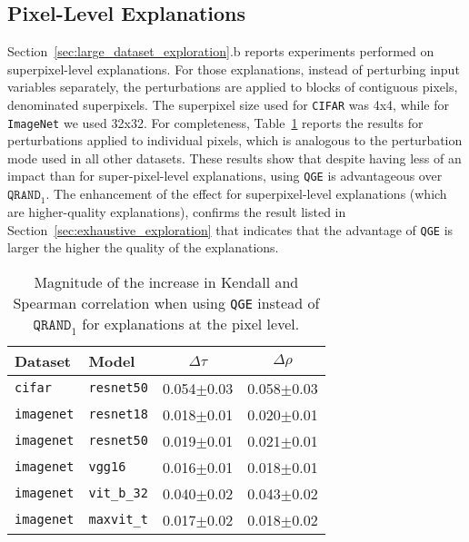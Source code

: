\subsection{Pixel-Level Explanations}\label{sec:pixel-level-explanations}
Section~\ref{sec:large_dataset_exploration}.b reports experiments performed on superpixel-level explanations. For those explanations, instead of perturbing input variables separately, the perturbations are applied to blocks of contiguous pixels, denominated superpixels. The superpixel size used for \texttt{CIFAR} was 4x4, while for \texttt{ImageNet} we used 32x32. For completeness, Table~\ref{tab:effects_per_model_and_dataset} reports the results for perturbations applied to individual pixels, which is analogous to the perturbation mode used in all other datasets. These results show that despite having less of an impact than for super-pixel-level explanations, using \texttt{QGE} is advantageous over $\texttt{QRAND}_1$. The enhancement of the effect for superpixel-level explanations (which are higher-quality explanations), confirms the result listed in Section~\ref{sec:exhaustive_exploration} that indicates that the advantage of \texttt{QGE} is larger the higher the quality of the explanations.

\begin{table}[!t]
    \vskip 0.15in
    \begin{center}
    \begin{small}
    \begin{sc}
    \begin{tabular}{l|l|c|c}
        Dataset & Model & $\Delta \tau$ & $\Delta\rho$\\
        \toprule
        \texttt{cifar} & \texttt{resnet50} & 0.054$\pm$0.03 & 0.058$\pm$0.03\\
        \texttt{imagenet} & \texttt{resnet18} & 0.018$\pm$0.01 & 0.020$\pm$0.01\\
        \texttt{imagenet} & \texttt{resnet50} & 0.019$\pm$0.01 & 0.021$\pm$0.01\\
        \texttt{imagenet} & \texttt{vgg16} & 0.016$\pm$0.01 & 0.018$\pm$0.01\\
        \texttt{imagenet} & \texttt{vit\_b\_32} & 0.040$\pm$0.02 & 0.043$\pm$0.02\\
        \texttt{imagenet} & \texttt{maxvit\_t} & 0.017$\pm$0.02 & 0.018$\pm$0.02\\
        \bottomrule
    \end{tabular}
    \caption{Magnitude of the increase in Kendall and Spearman correlation when using \texttt{QGE} instead of $\texttt{QRAND}_1$ for explanations at the pixel level.}
    \label{tab:effects_per_model_and_dataset}
    \end{sc}
    \end{small}
    \end{center}
\end{table}

